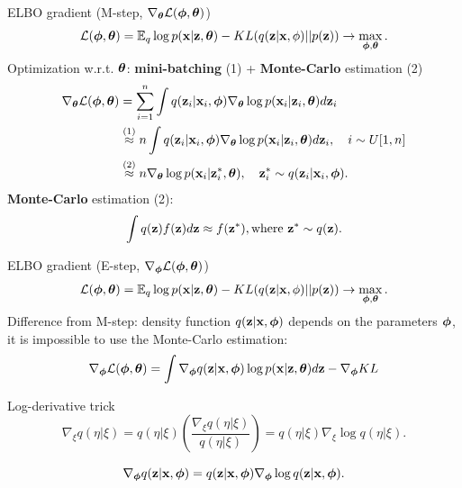 \begin{frame}{ELBO gradient (M-step, $\nabla_{\boldsymbol{\theta}} \mathcal{L}(\boldsymbol{\phi}, \boldsymbol{\theta})$)}
\vspace{-0.3cm}
\[
\mathcal{L} (\boldsymbol{\phi}, \boldsymbol{\theta})  = \mathbb{E}_{q} \log p(\mathbf{x} | \mathbf{z}, \boldsymbol{\theta}) - KL (q(\mathbf{z}| \mathbf{x}, \phi) || p(\mathbf{z})) \rightarrow \max_{\boldsymbol{\phi}, \boldsymbol{\theta}}.
\]
Optimization w.r.t. $\boldsymbol{\theta}$: \textbf{mini-batching} (1) + \textbf{Monte-Carlo} estimation (2)
\begin{align*}
	\nabla_{\boldsymbol{\theta}} \mathcal{L} (\boldsymbol{\phi}, \boldsymbol{\theta})
	&= \sum_{i=1}^n \int q(\mathbf{z}_i|\mathbf{x}_i, \boldsymbol{\phi}) \nabla_{\boldsymbol{\theta}}\log p(\mathbf{x}_i|\mathbf{z}_i, \boldsymbol{\theta})  d \mathbf{z}_i \\
	&\mathrel{\stackrel{\rm (1)}\approx} n\int q(\mathbf{z}_i|\mathbf{x}_i, \boldsymbol{\phi}) \nabla_{\boldsymbol{\theta}}\log p(\mathbf{x}_i|\mathbf{z}_i, \boldsymbol{\theta}) d \mathbf{z}_i , \quad i \sim U[1, n] \\
	&\mathrel{\stackrel{\rm (2)}\approx}  n \nabla_{\boldsymbol{\theta}}\log p(\mathbf{x}_i|\mathbf{z}^*_i, \boldsymbol{\theta}), \quad \mathbf{z}^*_i \sim q(\mathbf{z}_i|\mathbf{x}_i, \boldsymbol{\phi}).
\end{align*}
\textbf{Monte-Carlo} estimation (2):
\[
\int q(\mathbf{z}) f(\mathbf{z}) d\mathbf{z} \approx f(\mathbf{z}^*), \text{where } \mathbf{z}^* \sim q(\mathbf{z}).
\]
\end{frame}
\begin{frame}{ELBO gradient (E-step, $\nabla_{\boldsymbol{\phi}} \mathcal{L}(\boldsymbol{\phi}, \boldsymbol{\theta})$)}
\vspace{-0.3cm}
\[
\mathcal{L} (\boldsymbol{\phi}, \boldsymbol{\theta})  = \mathbb{E}_{q} \log p(\mathbf{x} | \mathbf{z}, \boldsymbol{\theta}) - KL (q(\mathbf{z}| \mathbf{x}, \phi) || p(\mathbf{z})) \rightarrow \max_{\boldsymbol{\phi}, \boldsymbol{\theta}}.
\]
Difference from M-step: density function $q(\mathbf{z}| \mathbf{x}, \boldsymbol{\phi})$ depends on the parameters $\boldsymbol{\phi}$, it is impossible to use the Monte-Carlo estimation:
\[
\nabla_{\boldsymbol{\phi}} \mathcal{L} (\boldsymbol{\phi}, \boldsymbol{\theta}) = \int \nabla_{\boldsymbol{\phi}} q(\mathbf{z}| \mathbf{x}, \boldsymbol{\phi}) \log p(\mathbf{x} |\mathbf{z}, \boldsymbol{\theta}) d\mathbf{z} - \nabla_{\boldsymbol{\phi}} KL
\]

\begin{block}{Log-derivative trick}
	\[
	\nabla_\xi q(\eta| \xi) = q(\eta | \xi) \left( \frac{\nabla_\xi q(\eta | \xi)}{q(\eta| \xi)} \right) = q(\eta | \xi) \nabla_\xi \log q(\eta| \xi).
	\]
\end{block}
\[
\nabla_{\boldsymbol{\phi}} q(\mathbf{z}| \mathbf{x}, \boldsymbol{\phi}) = q(\mathbf{z}| \mathbf{x}, \boldsymbol{\phi}) \nabla_{\boldsymbol{\phi}} \log q(\mathbf{z}| \mathbf{x}, \boldsymbol{\phi}).
\]
\end{frame}
